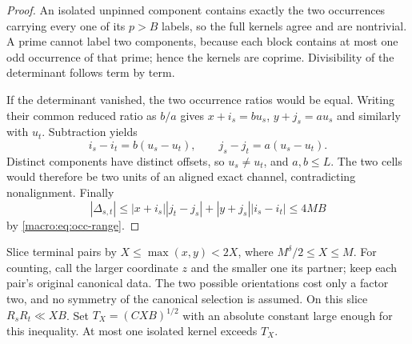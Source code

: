 \begin{proof}
An isolated unpinned component contains exactly the two occurrences
carrying every one of its $p>B$ labels, so the full kernels agree and
are nontrivial.  A prime cannot label two components, because each
block contains at most one odd occurrence of that prime; hence the
kernels are coprime.  Divisibility of the determinant follows term by
term.

If the determinant vanished, the two occurrence ratios would be equal.
Writing their common reduced ratio as $b/a$ gives
$x+i_s=bu_s$, $y+j_s=au_s$ and similarly with $u_t$.  Subtraction yields
\[
 i_s-i_t=b(u_s-u_t),
 \qquad j_s-j_t=a(u_s-u_t).
\]
Distinct components have distinct offsets, so $u_s\neq u_t$, and
$a,b\leq L$.  The two cells would therefore be two units of an aligned
exact channel, contradicting nonalignment.  Finally
\[
 |\Delta_{s,t}|
 \leq|x+i_s||j_t-j_s|+|y+j_s||i_s-i_t|
 \leq4MB
\]
by \eqref{macro:eq:occ-range}.
\end{proof}
Slice terminal pairs by $X\le\max(x,y)<2X$, where
$M^\delta/2\le X\le M$. For counting, call the larger coordinate $z$
and the smaller one its partner; keep each pair's original canonical data.
The two possible orientations cost only a factor two, and no symmetry
of the canonical selection is assumed. On this slice
$R_sR_t\ll XB$. Set $T_X=(C XB)^{1/2}$ with an absolute constant large
enough for this inequality. At most one isolated kernel exceeds $T_X$.

